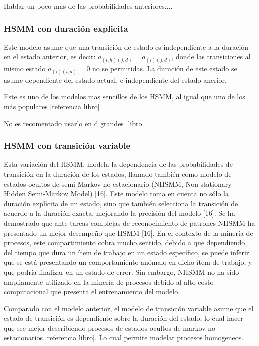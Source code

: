 Hablar un poco mas de las probabilidades anteriores....


\setcounter{secnumdepth}{4}
\subsubsection{HSMM con duración explicita }

Este modelo asume que una transición de estado es independiente a la duración en el estado anterior, es decir: $a_{(i,h)(j,d)} = a_{(i)(j,d)}$, donde las transiciones al mismo estado $a_{(i)(i,d)} = 0$ no se permitidas. La duración de este estado se asume dependiente del estado actual, e independiente del estado anerior.

Este es uno de los modelos mas sencillos de los HSMM, al igual que uno de los más populares [referencia libro]

No es recomentado usarlo en d grandes [libro]

\subsubsection{HSMM con transición variable }

Esta variación del HSMM, modela la dependencia de las probabilidades de transición en la duración de los estados, llamado también como modelo de estados ocultos de semi-Markov no estacionario (NHSMM, Non-stationary Hidden Semi-Markov Model) [16]. Este modelo toma en cuenta no sólo la duración explícita de un estado, sino que también selecciona la transición de acuerdo a la duración exacta, mejorando la precisión del modelo [16]. Se ha demostrado que ante tareas complejas de reconocimiento de patrones NHSMM ha presentado un mejor desempeño que HSMM [16]. En el contexto de la minería de procesos, este compartimiento cobra mucho sentido, debido a que dependiendo del tiempo que dura un ítem de trabajo en un estado específico, se puede inferir que se está presentando un comportamiento anómalo en dicho ítem de trabajo, y que podría finalizar en un estado de error. Sin embargo, NHSMM no ha sido ampliamente utilizado en la minería de procesos debido al alto costo computacional que presenta el entrenamiento del modelo.

Comparado con el modelo anterior, el modelo de transición variable asume que el estado de transición es dependiente sobre la duración del estado, lo cual hacer que see mejor describiendo procesos de estados ocultos de markov no estacionarios [referencia libro]. Lo cual permite modelar procesos homogeneos.

